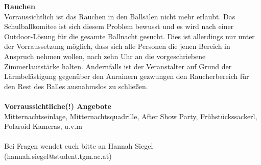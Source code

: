 \documentclass[12pt]{article}
\begin{document}
\textbf{Rauchen} \\
Vorraussichtlich ist das Rauchen in den Ballsälen nicht mehr erlaubt.
Das Schulballkomitee ist sich diesem Problem bewusst und es wird nach einer Outdoor-Lösung für die gesamte Ballnacht gesucht. Dies ist allerdings nur unter der Vorraussetzung möglich, dass sich alle Personen die jenen Bereich in Anspruch nehmen wollen, nach zehn Uhr an die vorgeschriebene Zimmerlautstärke halten.  Andernfalls ist der Veranstalter auf Grund der Lärmbelästigung gegenüber den Anrainern gezwungen den Raucherbereich für den Rest des Balles ausnahmslos zu schließen.\\ \\
\textbf{Vorraussichtliche(!) Angebote} \\
Mitternachtseinlage, Mitternachtsquadrille, After Show Party, Frühstückssackerl, Polaroid Kameras, u.v.m
\\ \\
Bei Fragen wendet euch bitte an Hannah Siegel (hannah.siegel@student.tgm.ac.at)
\end{document}

